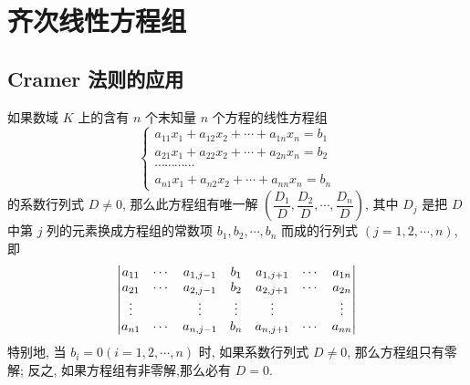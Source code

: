 \section{齐次线性方程组}

\subsection{Cramer 法则的应用}

\begin{theorem}[Cramer 法则]
    如果数域 $ K $ 上的含有 $ n $ 个末知量 $ n $ 个方程的线性方程组
    $$\begin{cases}
            a_{11} x_{1}+a_{12} x_{2}+\cdots+a_{1 n} x_{n}=b_{1} \\
            a_{21} x_{1}+a_{22} x_{2}+\cdots+a_{2 n} x_{n}=b_{2} \\
            \cdots \cdots \cdots \cdots                          \\
            a_{n 1} x_{1}+a_{n 2} x_{2}+\cdots+a_{n n} x_{n}=b_{n}
        \end{cases}$$
    的系数行列式 $ D \neq 0$, 那么此方程组有唯一解 $ \left(\dfrac{D_{1}}{D}, \dfrac{D_{2}}{D}, \cdots, \dfrac{D_{n}}{D}\right)$, 
    其中 $ D_{j} $ 是把 $ D $ 中第 $ j $ 列的元素换成方程组的常数项 $ b_{1}, b_{2}, \cdots, b_{n} $ 而成的行列式 $ (j=1,2, \cdots, n)$, 即
    $$\mqty|a_{11}  & \cdots & a_{1, j-1} & b_{1}  & a_{1, j+1} & \cdots & a_{1 n} \\
        a_{21}  & \cdots & a_{2, j-1} & b_{2}  & a_{2, j+1} & \cdots & a_{2 n} \\
        \vdots  &        & \vdots     & \vdots & \vdots     &        & \vdots  \\
        a_{n 1} & \cdots & a_{n, j-1} & b_{n}  & a_{n, j+1} & \cdots & a_{n n}|$$
    特别地, 当 $ b_{i}=0(i=1,2, \cdots, n) $ 时, 如果系数行列式 $ D \neq 0 $, 那么方程组只有零解;
    反之, 如果方程组有非零解,那么必有 $ D=0 .$
\end{theorem}

